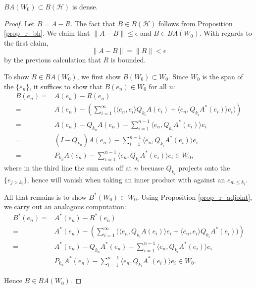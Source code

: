 \documentclass[12pt]{article}
\begin{document}
\begin{theorem}
	$BA(W_0)\subset B(\mathcal{H})$ is dense.
\end{theorem}
\begin{proof}
	Let $B = A - R$. The fact that $B\in B(\mathcal{H})$ follows from Proposition \ref{prop_r_bh}. We claim that $\|A-B\|\leq \epsilon$ and $B\in BA(W_0)$. With regards to the first claim,
	\begin{equation*}
		\|A-B\|=\|R\| < \epsilon
	\end{equation*}
	by the previous calculation that $R$ is bounded. 

	To show $B\in BA(W_0)$, we first show $B(W_0)\subset W_0$. Since $W_0$ is the span of the $\{e_n\}$, it suffices to show that $B(e_n)\in W_0$ for all $n$:
	\begin{align*}
		B(e_n)
		=& A(e_n) - R(e_n) \\
		=& A(e_n) - \left( \sum_{i=1}^\infty \Big( \langle e_n, e_i \rangle Q_{k_i}A(e_i) + \langle e_n, Q_{k_i}A^\ast(e_i) \rangle e_i \Big) \right) \\
		=& A(e_n) - Q_{k_n}A(e_n) - \sum_{i=1}^{n-1} \langle e_n, Q_{k_i}A^\ast(e_i) \rangle e_i \\
		=& (I-Q_{k_n})A(e_n) - \sum_{i=1}^{n-1} \langle e_n, Q_{k_i}A^\ast(e_i) \rangle e_i \\
		=& P_{k_n}A(e_n) - \sum_{i=1}^{n-1} \langle e_n, Q_{k_i}A^\ast(e_i) \rangle e_i \in W_0,
	\end{align*}
	where  in the third line the sum cuts off at $n$ becuase $Q_{k_i}$ projects onto the $\{e_{j>k_i}\}$, hence will vanish when taking an inner product with against an $e_{m\leq k_i}$.

	All that remains is to show $B^\ast(W_0)\subset W_0$. Using Proposition \ref{prop_r_adjoint}, we carry out an analagous computation:
	\begin{align*}
		B^\ast(e_n)
		=& A^\ast(e_n) - R^\ast(e_n) \\
		=& A^\ast(e_n) - \left(\sum_{i=1}^\infty \big( \langle e_n, Q_{k_i}A(e_i) \rangle e_i + \langle e_n, e_i \rangle Q_{k_i}A^\ast (e_i) \Big)\right) \\
		=& A^\ast(e_n) - Q_{k_n}A^\ast(e_n) - \sum_{i=1}^{n-1}\langle e_n, Q_{k_i}A^\ast(e_i)\rangle e_i \\
		=& P_{k_n}A^\ast(e_n) - \sum_{i=1}^{n-1}\langle e_n, Q_{k_i}A^\ast(e_i)\rangle e_i \in W_0.
	\end{align*}

	Hence $B\in BA(W_0)$.
\end{proof}
\end{document}
